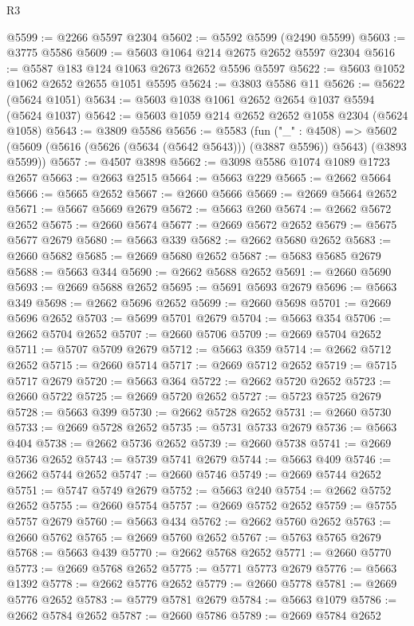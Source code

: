 \begin{lexlean}{R3}
\begin{coremodule}
@5599 := @2266 @5597 @2304
@5602 := @5592 @5599 (@2490 @5599)
@5603 := @3775 @5586
@5609 := @5603 @1064 @214 @2675 @2652 @5597 @2304
@5616 := @5587 @183 @124 @1063 @2673 @2652 @5596 @5597
@5622 := @5603 @1052 @1062 @2652 @2655 @1051 @5595
@5624 := @3803 @5586 @11
@5626 := @5622 (@5624 @1051)
@5634 := @5603 @1038 @1061 @2652 @2654 @1037 @5594 (@5624 @1037)
@5642 := @5603 @1059 @214 @2652 @2652 @1058 @2304 (@5624 @1058)
@5643 := @3809 @5586
@5656 := @5583
    (fun ("_" : @4508) =>
    @5602 (@5609 (@5616 (@5626 (@5634 (@5642 @5643))) (@3887 @5596)) @5643) (@3893 @5599))
@5657 := @4507 @3898
@5662 := @3098 @5586 @1074 @1089 @1723 @2657
@5663 := @2663 @2515
@5664 := @5663 @229
@5665 := @2662 @5664
@5666 := @5665 @2652
@5667 := @2660 @5666
@5669 := @2669 @5664 @2652
@5671 := @5667 @5669 @2679
@5672 := @5663 @260
@5674 := @2662 @5672 @2652
@5675 := @2660 @5674
@5677 := @2669 @5672 @2652
@5679 := @5675 @5677 @2679
@5680 := @5663 @339
@5682 := @2662 @5680 @2652
@5683 := @2660 @5682
@5685 := @2669 @5680 @2652
@5687 := @5683 @5685 @2679
@5688 := @5663 @344
@5690 := @2662 @5688 @2652
@5691 := @2660 @5690
@5693 := @2669 @5688 @2652
@5695 := @5691 @5693 @2679
@5696 := @5663 @349
@5698 := @2662 @5696 @2652
@5699 := @2660 @5698
@5701 := @2669 @5696 @2652
@5703 := @5699 @5701 @2679
@5704 := @5663 @354
@5706 := @2662 @5704 @2652
@5707 := @2660 @5706
@5709 := @2669 @5704 @2652
@5711 := @5707 @5709 @2679
@5712 := @5663 @359
@5714 := @2662 @5712 @2652
@5715 := @2660 @5714
@5717 := @2669 @5712 @2652
@5719 := @5715 @5717 @2679
@5720 := @5663 @364
@5722 := @2662 @5720 @2652
@5723 := @2660 @5722
@5725 := @2669 @5720 @2652
@5727 := @5723 @5725 @2679
@5728 := @5663 @399
@5730 := @2662 @5728 @2652
@5731 := @2660 @5730
@5733 := @2669 @5728 @2652
@5735 := @5731 @5733 @2679
@5736 := @5663 @404
@5738 := @2662 @5736 @2652
@5739 := @2660 @5738
@5741 := @2669 @5736 @2652
@5743 := @5739 @5741 @2679
@5744 := @5663 @409
@5746 := @2662 @5744 @2652
@5747 := @2660 @5746
@5749 := @2669 @5744 @2652
@5751 := @5747 @5749 @2679
@5752 := @5663 @240
@5754 := @2662 @5752 @2652
@5755 := @2660 @5754
@5757 := @2669 @5752 @2652
@5759 := @5755 @5757 @2679
@5760 := @5663 @434
@5762 := @2662 @5760 @2652
@5763 := @2660 @5762
@5765 := @2669 @5760 @2652
@5767 := @5763 @5765 @2679
@5768 := @5663 @439
@5770 := @2662 @5768 @2652
@5771 := @2660 @5770
@5773 := @2669 @5768 @2652
@5775 := @5771 @5773 @2679
@5776 := @5663 @1392
@5778 := @2662 @5776 @2652
@5779 := @2660 @5778
@5781 := @2669 @5776 @2652
@5783 := @5779 @5781 @2679
@5784 := @5663 @1079
@5786 := @2662 @5784 @2652
@5787 := @2660 @5786
@5789 := @2669 @5784 @2652

\end{coremodule}
\end{lexlean}
